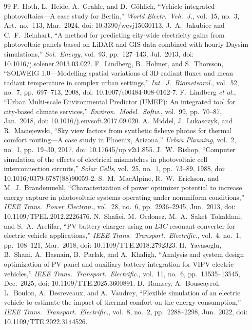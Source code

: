 \documentclass[lettersize,journal]{IEEEtran}
\begin{document}
\begin{thebibliography}{99}
 P.~Hoth, L.~Heide, A.~Grahle, and D.~G\"ohlich, ``Vehicle-integrated photovoltaics---A case study for Berlin,'' \emph{World Electr.\ Veh.\ J.}, vol.~15, no.~3, Art.~no.~113, Mar.\ 2024, doi: 10.3390/wevj15030113.
 J.~A.~Jakubiec and C.~F.~Reinhart, ``A method for predicting city-wide electricity gains from photovoltaic panels based on LiDAR and GIS data combined with hourly Daysim simulations,'' \emph{Sol.\ Energy}, vol.~93, pp.~127--143, Jul.\ 2013, doi: 10.1016/j.solener.2013.03.022.
 F.~Lindberg, B.~Holmer, and S.~Thorsson, ``SOLWEIG 1.0---Modelling spatial variations of 3D radiant fluxes and mean radiant temperature in complex urban settings,'' \emph{Int.\ J.\ Biometeorol.}, vol.~52, no.~7, pp.~697--713, 2008, doi: 10.1007/s00484-008-0162-7.
 F.~Lindberg \emph{et al.}, ``Urban Multi-scale Environmental Predictor (UMEP): An integrated tool for city-based climate services,'' \emph{Environ.\ Model.\ Softw.}, vol.~99, pp.~70--87, Jan.\ 2018, doi: 10.1016/j.envsoft.2017.09.020.
 A.~Middel, J.~Lukasczyk, and R.~Maciejewski, ``Sky view factors from synthetic fisheye photos for thermal comfort routing---A case study in Phoenix, Arizona,'' \emph{Urban Planning}, vol.~2, no.~1, pp.~19--30, 2017, doi: 10.17645/up.v2i1.855.
 J.~W.~Bishop, ``Computer simulation of the effects of electrical mismatches in photovoltaic cell interconnection circuits,'' \emph{Solar Cells}, vol.~25, no.~1, pp.~73--89, 1988, doi: 10.1016/0379-6787(88)90059-2.
 S.~M.~MacAlpine, R.~W.~Erickson, and M.~J.~Brandemuehl, ``Characterization of power optimizer potential to increase energy capture in photovoltaic systems operating under nonuniform conditions,'' \emph{IEEE Trans.\ Power Electron.}, vol.~28, no.~6, pp.~2936--2945, Jun.\ 2013, doi: 10.1109/TPEL.2012.2226476.
 N.~Shafiei, M.~Ordonez, M.~A.~Saket~Tokaldani, and S.~A.~Arefifar, ``PV battery charger using an $L3C$ resonant converter for electric vehicle applications,'' \emph{IEEE Trans.\ Transport.\ Electrific.}, vol.~4, no.~1, pp.~108--121, Mar.\ 2018, doi: 10.1109/TTE.2018.2792323.
 H.~Yavasoglu, B.~Shani, A.~Hasnain, B.~Parlak, and A.~Khaligh, ``Analysis and system design optimization of PV panel and auxiliary battery integration for VIPV electric vehicles,'' \emph{IEEE Trans.\ Transport.\ Electrific.}, vol.~11, no.~6, pp.~13535--13545, Dec.\ 2025, doi: 10.1109/TTE.2025.3600891.
 D.~Ramsey, A.~Bouscayrol, L.~Boulon, A.~Desreveaux, and A.~Vaudrey, ``Flexible simulation of an electric vehicle to estimate the impact of thermal comfort on the energy consumption,'' \emph{IEEE Trans.\ Transport.\ Electrific.}, vol.~8, no.~2, pp.~2288--2298, Jun.\ 2022, doi: 10.1109/TTE.2022.3144526.

\end{thebibliography}
\end{document}
